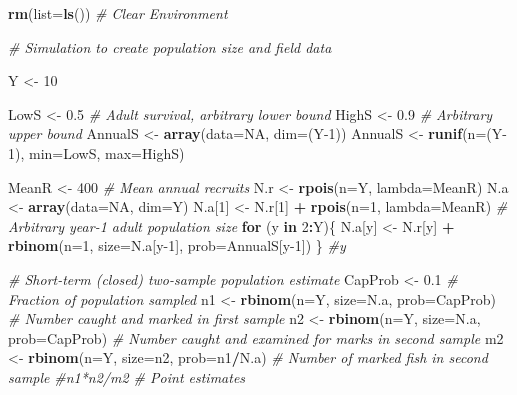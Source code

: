 \documentclass[
]{krantz}
\makeatletter
\newenvironment{Shaded}{\begin{snugshade}}{\end{snugshade}}
\newcommand{\AttributeTok}[1]{\textcolor[rgb]{0.27,0.27,0.27}{#1}}
\newcommand{\CommentTok}[1]{\textcolor[rgb]{0.37,0.37,0.37}{\textit{#1}}}
\newcommand{\ConstantTok}[1]{\textcolor[rgb]{0.37,0.37,0.37}{#1}}
\newcommand{\ControlFlowTok}[1]{\textcolor[rgb]{0.27,0.27,0.27}{\textbf{#1}}}
\newcommand{\DecValTok}[1]{\textcolor[rgb]{0.06,0.06,0.06}{#1}}
\newcommand{\FloatTok}[1]{\textcolor[rgb]{0.06,0.06,0.06}{#1}}
\newcommand{\FunctionTok}[1]{\textcolor[rgb]{0.27,0.27,0.27}{\textbf{#1}}}
\newcommand{\NormalTok}[1]{#1}
\newcommand{\OtherTok}[1]{\textcolor[rgb]{0.37,0.37,0.37}{#1}}
\newcommand{\SpecialCharTok}[1]{\textcolor[rgb]{0.43,0.43,0.43}{\textbf{#1}}}
\newenvironment{kframe}{%
\medskip{}
\setlength{\fboxsep}{.8em}
 \def\at@end@of@kframe{}%
 \ifinner\ifhmode%
  \def\at@end@of@kframe{\end{minipage}}%
  \begin{minipage}{\columnwidth}%
 \fi\fi%
 \def\FrameCommand##1{\hskip\@totalleftmargin \hskip-\fboxsep
 \colorbox{shadecolor}{##1}\hskip-\fboxsep
     \hskip-\linewidth \hskip-\@totalleftmargin \hskip\columnwidth}%
 \MakeFramed {\advance\hsize-\width
   \@totalleftmargin\z@ \linewidth\hsize
   \@setminipage}}%
 {\par\unskip\endMakeFramed%
 \at@end@of@kframe}
\renewenvironment{Shaded}{\begin{kframe}}{\end{kframe}}
\makeatother
\begin{document}
\begin{Shaded}
\begin{Highlighting}[]
\FunctionTok{rm}\NormalTok{(}\AttributeTok{list=}\FunctionTok{ls}\NormalTok{()) }\CommentTok{\# Clear Environment}

\CommentTok{\# Simulation to create population size and field data}

\NormalTok{Y }\OtherTok{\textless{}{-}} \DecValTok{10}

\NormalTok{LowS }\OtherTok{\textless{}{-}} \FloatTok{0.5} \CommentTok{\# Adult survival, arbitrary lower bound}
\NormalTok{HighS }\OtherTok{\textless{}{-}} \FloatTok{0.9} \CommentTok{\# Arbitrary upper bound}
\NormalTok{AnnualS }\OtherTok{\textless{}{-}} \FunctionTok{array}\NormalTok{(}\AttributeTok{data=}\ConstantTok{NA}\NormalTok{, }\AttributeTok{dim=}\NormalTok{(Y}\DecValTok{{-}1}\NormalTok{))}
\NormalTok{AnnualS }\OtherTok{\textless{}{-}} \FunctionTok{runif}\NormalTok{(}\AttributeTok{n=}\NormalTok{(Y}\DecValTok{{-}1}\NormalTok{), }\AttributeTok{min=}\NormalTok{LowS, }\AttributeTok{max=}\NormalTok{HighS)}

\NormalTok{MeanR }\OtherTok{\textless{}{-}} \DecValTok{400} \CommentTok{\# Mean annual recruits}
\NormalTok{N.r }\OtherTok{\textless{}{-}} \FunctionTok{rpois}\NormalTok{(}\AttributeTok{n=}\NormalTok{Y, }\AttributeTok{lambda=}\NormalTok{MeanR)}
\NormalTok{N.a }\OtherTok{\textless{}{-}} \FunctionTok{array}\NormalTok{(}\AttributeTok{data=}\ConstantTok{NA}\NormalTok{, }\AttributeTok{dim=}\NormalTok{Y)}
\NormalTok{N.a[}\DecValTok{1}\NormalTok{] }\OtherTok{\textless{}{-}}\NormalTok{ N.r[}\DecValTok{1}\NormalTok{] }\SpecialCharTok{+} \FunctionTok{rpois}\NormalTok{(}\AttributeTok{n=}\DecValTok{1}\NormalTok{, }\AttributeTok{lambda=}\NormalTok{MeanR) }\CommentTok{\# Arbitrary year{-}1 adult population size}
\ControlFlowTok{for}\NormalTok{ (y }\ControlFlowTok{in} \DecValTok{2}\SpecialCharTok{:}\NormalTok{Y)\{}
\NormalTok{  N.a[y] }\OtherTok{\textless{}{-}}\NormalTok{ N.r[y] }\SpecialCharTok{+} \FunctionTok{rbinom}\NormalTok{(}\AttributeTok{n=}\DecValTok{1}\NormalTok{, }\AttributeTok{size=}\NormalTok{N.a[y}\DecValTok{{-}1}\NormalTok{], }\AttributeTok{prob=}\NormalTok{AnnualS[y}\DecValTok{{-}1}\NormalTok{])}
\NormalTok{  \} }\CommentTok{\#y}

\CommentTok{\# Short{-}term (closed) two{-}sample population estimate}
\NormalTok{CapProb }\OtherTok{\textless{}{-}} \FloatTok{0.1} \CommentTok{\# Fraction of population sampled}
\NormalTok{n1 }\OtherTok{\textless{}{-}} \FunctionTok{rbinom}\NormalTok{(}\AttributeTok{n=}\NormalTok{Y, }\AttributeTok{size=}\NormalTok{N.a, }\AttributeTok{prob=}\NormalTok{CapProb) }\CommentTok{\# Number caught and marked in first sample}
\NormalTok{n2 }\OtherTok{\textless{}{-}} \FunctionTok{rbinom}\NormalTok{(}\AttributeTok{n=}\NormalTok{Y, }\AttributeTok{size=}\NormalTok{N.a, }\AttributeTok{prob=}\NormalTok{CapProb) }\CommentTok{\# Number caught and examined for marks in second sample}
\NormalTok{m2 }\OtherTok{\textless{}{-}} \FunctionTok{rbinom}\NormalTok{(}\AttributeTok{n=}\NormalTok{Y, }\AttributeTok{size=}\NormalTok{n2, }\AttributeTok{prob=}\NormalTok{n1}\SpecialCharTok{/}\NormalTok{N.a) }\CommentTok{\# Number of marked fish in second sample}
\CommentTok{\#n1*n2/m2 \# Point estimates}


\end{Highlighting}
\end{Shaded}
\end{document}
